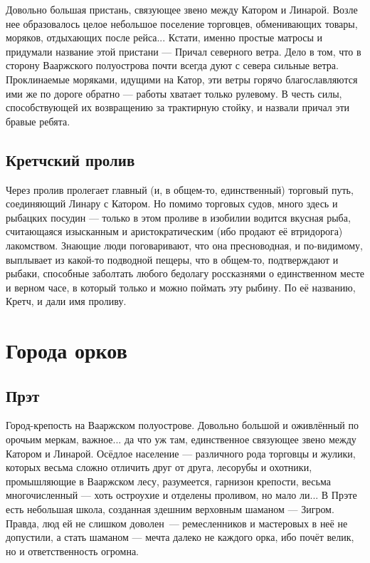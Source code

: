 \documentclass[12pt,a4paper]{book}
\begin{document}
Довольно большая пристань, связующее звено между Катором и Линарой. Возле нее образовалось целое небольшое поселение торговцев, обменивающих товары, моряков, отдыхающих после рейса... Кстати, именно простые матросы и придумали название этой пристани --- Причал северного ветра. Дело в том, что в сторону Вааржского полуострова почти всегда дуют с севера сильные ветра. Проклинаемые моряками, идущими на Катор, эти ветры горячо благославляются ими же по дороге обратно --- работы хватает только рулевому. В честь силы, способствующей их возвращению за трактирную стойку, и назвали причал эти бравые ребята.

\subsection{Кретчский пролив}

Через пролив пролегает главный (и, в общем-то, единственный) торговый путь, соединяющий Линару с Катором. Но помимо торговых судов, много здесь и рыбацких посудин --- только в этом проливе в изобилии водится вкусная рыба, считающаяся изысканным и аристократическим (ибо продают её втридорога) лакомством. Знающие люди поговаривают, что она пресноводная, и по-видимому, выплывает из какой-то подводной пещеры, что в общем-то, подтверждают и рыбаки, способные заболтать любого бедолагу россказнями о единственном месте и верном часе, в который только и можно поймать эту рыбину. По её названию, Кретч, и дали имя проливу.

\section{Города орков}

\subsection{Прэт}

Город-крепость на Вааржском полуострове. Довольно большой и оживлённый по орочьим меркам, важное... да что уж там, единственное связующее звено между Катором и Линарой. Осёдлое население --- различного рода торговцы и жулики, которых весьма сложно отличить друг от друга, лесорубы и охотники, промышляющие в Вааржском лесу, разумеется, гарнизон крепости, весьма многочисленный --- хоть остроухие и отделены проливом, но мало ли... В Прэте есть небольшая школа, созданная здешним верховным шаманом --- Зигром. Правда, люд ей не слишком \mbox{доволен ---} ремесленников и мастеровых в неё не допустили, а стать шаманом --- мечта далеко не каждого орка, ибо почёт велик, но и ответственность огромна.
\end{document}
